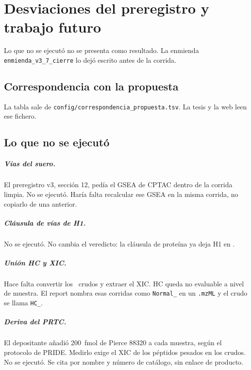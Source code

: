 \chapter{Desviaciones del preregistro y trabajo futuro}

Lo que no se ejecutó no se presenta como resultado. La enmienda \texttt{enmienda\_v3\_7\_cierre} lo dejó escrito antes de la corrida. \Advertencia

\section{Correspondencia con la propuesta}
La tabla sale de \texttt{config/correspondencia\_propuesta.tsv}. La tesis y la web leen ese fichero.

{\small

}

\section{Lo que no se ejecutó}

\paragraph{Vías del suero.}
El preregistro v3, sección 12, pedía el GSEA de CPTAC dentro de la corrida limpia. No se ejecutó. Haría falta recalcular ese GSEA en la misma corrida, no copiarlo de una anterior.

\paragraph{Cláusula de vías de H1.}
No se ejecutó. No cambia el veredicto: la cláusula de proteína ya deja H1 en \HunoVeredicto.

\paragraph{Unión HC y XIC.}
Hace falta convertir los \PreCrudos\ crudos y extraer el XIC. HC queda no evaluable a nivel de muestra. El report nombra esas corridas como \texttt{Normal\_} en un \texttt{.mzML} y el crudo se llama \texttt{HC\_}.

\paragraph{Deriva del PRTC.}
El depositante añadió 200~fmol de Pierce 88320 a cada muestra, según el protocolo de PRIDE. Medirlo exige el XIC de los péptidos pesados en los crudos. No se ejecutó. Se cita por nombre y número de catálogo, sin enlace de producto.

